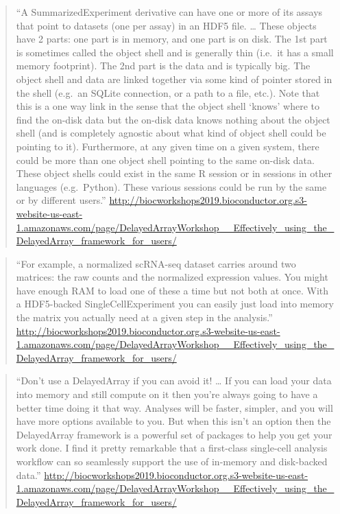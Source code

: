 \documentclass[]{tufte-book}
\begin{document}
\begin{quote}
``A SummarizedExperiment derivative can have one or more of its assays that point to datasets (one per assay) in an HDF5 file. \ldots{} These objects have 2 parts: one part is in memory, and one part is on disk. The 1st part is sometimes called the object shell and is generally thin (i.e.~it has a small memory footprint). The 2nd part is the data and is typically big. The object shell and data are linked together via some kind of pointer stored in the shell (e.g.~an SQLite connection, or a path to a file, etc.). Note that this is a one way link in the sense that the object shell `knows' where to find the on-disk data but the on-disk data knows nothing about the object shell (and is completely agnostic about what kind of object shell could be pointing to it). Furthermore, at any given time on a given system, there could be more than one object shell pointing to the same on-disk data. These object shells could exist in the same R session or in sessions in other languages (e.g.~Python). These various sessions could be run by the same or by different users.'' \url{http://biocworkshops2019.bioconductor.org.s3-website-us-east-1.amazonaws.com/page/DelayedArrayWorkshop__Effectively_using_the_DelayedArray_framework_for_users/}
\end{quote}

\begin{quote}
``For example, a normalized scRNA-seq dataset carries around two matrices: the raw counts and the normalized expression values. You might have enough RAM to load one of these a time but not both at once. With a HDF5-backed SingleCellExperiment you can easily just load into memory the matrix you actually need at a given step in the analysis.'' \url{http://biocworkshops2019.bioconductor.org.s3-website-us-east-1.amazonaws.com/page/DelayedArrayWorkshop__Effectively_using_the_DelayedArray_framework_for_users/}
\end{quote}

\begin{quote}
``Don't use a DelayedArray if you can avoid it! \ldots{} If you can load your data into memory and still compute on it then you're always going to have a better time doing it that way. Analyses will be faster, simpler, and you will have more options available to you. But when this isn't an option then the DelayedArray framework is a powerful set of packages to help you get your work done. I find it pretty remarkable that a first-class single-cell analysis workflow can so seamlessly support the use of in-memory and disk-backed data.'' \url{http://biocworkshops2019.bioconductor.org.s3-website-us-east-1.amazonaws.com/page/DelayedArrayWorkshop__Effectively_using_the_DelayedArray_framework_for_users/}
\end{quote}
\end{document}
